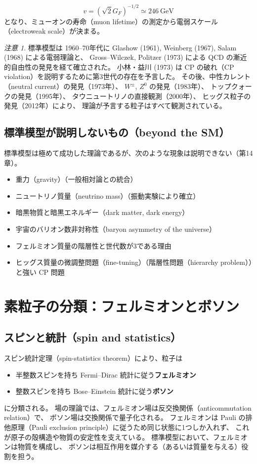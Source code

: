 \documentclass[uplatex,dvipdfmx,a4paper,11pt,openany]{jsbook}
\newcommand{\en}[1]{（#1）}
\numberwithin{equation}{chapter}
\theoremstyle{definition}
\theoremstyle{plain}
\theoremstyle{remark}
\newtheorem{remark}{注意}[chapter]
\begin{document}
\begin{equation}
v=(\sqrt2G_F)^{-1/2}\simeq246\ \mathrm{GeV}
\end{equation}
となり、ミューオンの寿命\en{muon lifetime}の測定から電弱スケール\en{electroweak scale}が決まる。
\begin{remark}
標準模型は 1960--70年代に
Glashow (1961), Weinberg (1967), Salam (1968) による電弱理論と、
Gross--Wilczek, Politzer (1973) による QCD の漸近的自由性の発見を経て確立された。
小林・益川 (1973) は CP の破れ\en{CP violation}を説明するために第3世代の存在を予言した。
その後、中性カレント\en{neutral current}の発見（1973年）、
$W^\pm$, $Z^0$ の発見（1983年）、
トップクォークの発見（1995年）、
タウニュートリノの直接観測（2000年）、
ヒッグス粒子の発見（2012年）により、
理論が予言する粒子はすべて観測されている。
\end{remark}
\subsection{標準模型が説明しないもの（beyond the SM）}
標準模型は極めて成功した理論であるが、次のような現象は説明できない（第14章）。
\begin{itemize}
    \item 重力\en{gravity}（一般相対論との統合）
    \item ニュートリノ質量\en{neutrino mass}（振動実験により確立）
    \item 暗黒物質と暗黒エネルギー\en{dark matter, dark energy}
    \item 宇宙のバリオン数非対称性\en{baryon asymmetry of the universe}
    \item フェルミオン質量の階層性と世代数が3である理由
    \item ヒッグス質量の微調整問題\en{fine-tuning}（階層性問題\en{hierarchy problem}）と強い CP 問題
\end{itemize}
\section{素粒子の分類：フェルミオンとボソン}
\subsection{スピンと統計（spin and statistics）}
スピン統計定理\en{spin-statistics theorem}により、粒子は
\begin{itemize}
    \item 半整数スピンを持ち Fermi--Dirac 統計に従う\textbf{フェルミオン}
    \item 整数スピンを持ち Bose--Einstein 統計に従う\textbf{ボソン}
\end{itemize}
に分類される。
場の理論では、フェルミオン場は反交換関係\en{anticommutation relation}で、
ボソン場は交換関係で量子化される。
フェルミオンは Pauli の排他原理\en{Pauli exclusion principle}に従うため同じ状態に1つしか入れず、
これが原子の殻構造や物質の安定性を支えている。
標準模型において、フェルミオンは物質を構成し、
ボソンは相互作用を媒介する（あるいは質量を与える）役割を担う。
\end{document}
